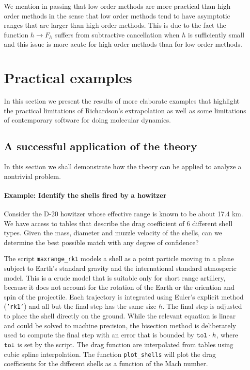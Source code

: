 \documentclass[runningheads]{llncs}
\begin{document}
We mention in passing that low order methods are more practical than high order methods in the sense that low order methods tend to have asymptotic ranges that are larger than high order methods.
This is due to the fact the function $h \rightarrow F_h$ suffers from subtractive cancellation when $h$ is sufficiently small and this issue is more acute for high order methods than for low order methods.


\section{Practical examples}

In this section we present the results of more elaborate examples that highlight the practical limitations of Richardson's extrapolation as well as some limitations of contemporary software for doing molecular dynamics.

\subsection{A successful application of the theory}

In this section we shall demonstrate how the theory can be applied to analyze a nontrivial problem.

\paragraph{Example: Identify the shells fired by a howitzer}

Consider the D-20 howitzer whose effective range is known to be about 17.4 km. We have access to tables that describe the drag coefficient of 6 different shell types. Given the mass, diameter and muzzle velocity of the shells, can we determine the best possible match with any degree of confidence?

The script {\tt maxrange\_rk1} models a shell as a point particle moving in a plane subject to Earth's standard gravity and the international standard atmosperic model. This is a crude model that is suitable only for short range artillery, because it does not account for the rotation of the Earth or the oriention and spin of the projectile. Each trajectory is integrated using Euler's explicit method ({\tt 'rk1'}) and all but the final step has the same size $h$. The final step is adjusted to place the shell directly on the ground. While the relevant equation is linear and could be solved to machine precision, the bisection method is deliberately used to compute the final step with an error that is bounded by ${\tt tol} \cdot h$, where ${\tt tol}$ is set by the script. The drag function are interpolated from tables using cubic spline interpolation. The function {\tt plot\_shells} will plot the drag coefficients for the different shells as a function of the Mach number.
\end{document}
